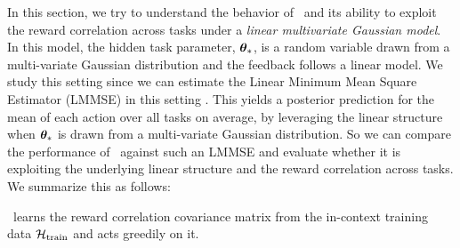 In this section, we try to understand the behavior of \pred\ and its ability to exploit the reward correlation across tasks under a \emph{linear multivariate Gaussian model}. In this model, the hidden task parameter, $\boldsymbol{\theta}_*$, is a random variable drawn from a multi-variate Gaussian distribution \citep{bishop2006pattern} and the feedback follows a linear model.
%
We study this setting since we can estimate the Linear Minimum Mean Square Estimator (LMMSE) in this setting \citep{carlin2008bayesian, box2011bayesian}. 
%
This yields a posterior prediction for the mean of each action over all tasks on average, by leveraging the linear structure when $\boldsymbol{\theta}_*$ is drawn from a multi-variate Gaussian distribution. 
%
So we can compare the performance of \pred\ against such an LMMSE and evaluate whether it is exploiting the underlying linear structure and the reward correlation across tasks. We summarize this as follows:

\begin{tcolorbox}
\customfinding \pred\ learns the reward correlation covariance matrix from the in-context training data $\mathcal{H}_{\text{train}}$ and acts greedily on it.
\end{tcolorbox}

%
%
%





